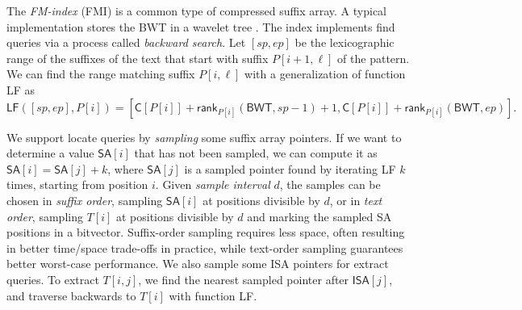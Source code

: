 \documentclass[a4paper,11pt]{llncs}
\newcommand{\SA}{\textsf{SA}}
\newcommand{\ISA}{\textsf{ISA}}
\newcommand{\BWT}{\textsf{BWT}}
\newcommand{\FMI}{\textsf{FMI}}
\newcommand{\mSA}{\ensuremath{\mathsf{SA}}}
\newcommand{\mISA}{\ensuremath{\mathsf{ISA}}}
\newcommand{\mBWT}{\ensuremath{\mathsf{BWT}}}
\newcommand{\mC}{\ensuremath{\mathsf{C}}}
\newcommand{\LF}{\textsf{LF}}
\newcommand{\find}{\textsf{find}}
\newcommand{\locate}{\textsf{locate}}
\newcommand{\extract}{\textsf{extract}}
\newcommand{\mLF}{\ensuremath{\mathsf{LF}}}
\newcommand{\mrank}{\ensuremath{\mathsf{rank}}}
\begin{document}
The \emph{FM-index} (\FMI) \cite{Ferragina2005a} is a common type of compressed suffix array. A typical implementation stores the \BWT{} in a wavelet tree \cite{Grossi2003}. The index implements \find{} queries via a process called \emph{backward search}. Let $[sp,ep]$ be the lexicographic range of the suffixes of the text that start with suffix $P[i+1,\ell]$ of the pattern. We can find the range matching suffix $P[i,\ell]$ with a generalization of function \LF{} as
$$
\mLF([sp,ep],P[i]) =
[\mC[P[i]] + \mrank_{P[i]}(\mBWT, sp-1) + 1,
\mC[P[i]] + \mrank_{P[i]}(\mBWT, ep)].
$$

We support \locate{} queries by \emph{sampling} some suffix array pointers. If we want to determine a value $\mSA[i]$ that has not been sampled, we can compute it as $\mSA[i] = \mSA[j]+k$, where $\mSA[j]$ is a sampled pointer found by iterating \LF{} $k$ times, starting from position $i$. Given \emph{sample interval} $d$, the samples can be chosen in \emph{suffix order}, sampling $\mSA[i]$ at positions divisible by $d$, or in \emph{text order}, sampling $T[i]$ at positions divisible by $d$ and marking the sampled \SA{} positions in a bitvector. Suffix-order sampling requires less space, often resulting in better time/space trade-offs in practice, while text-order sampling guarantees better worst-case performance. We also sample some \ISA{} pointers for \extract{} queries. To extract $T[i,j]$, we find the nearest sampled pointer after $\mISA[j]$, and traverse backwards to $T[i]$ with function \LF.
\end{document}
